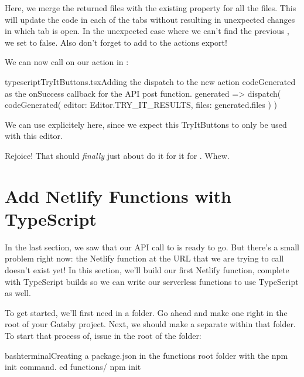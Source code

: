 \documentclass[paper=6in:9in,pagesize=pdftex,headinclude=on,footinclude=on,12pt,twoside]{scrbook}
\begin{document}
Here, we merge the returned files with the existing  property for all the files. This will update the code in each of the tabs without resulting in unexpected changes in which tab is open. In the unexpected case where we can't find the previous , we set  to false. Also don't forget to add  to the actions export!


We can now call  on our  action in :

\begin{codeInput}{typescript}{TryItButtons.tsx}{Adding the dispatch to the new action codeGenerated\, as the onSuccess callback for the API post function.}
generated => {
  dispatch(
    codeGenerated({
      editor: Editor.TRY_IT_RESULTS,
      files: generated.files
    })
  )
}
\end{codeInput}

We can use  explicitely here, since we expect this TryItButtons to only be used with this editor.

Rejoice! That should \textit{finally} just about do it for it for . Whew. 

\section{Add Netlify Functions with TypeScript}

In the last section, we saw that our API call to  is ready to go. But there's a small problem right now: the Netlify function at the URL  that we are trying to call doesn't exist yet! In this section, we'll build our first Netlify function, complete with TypeScript builds so we can write our serverless functions to use TypeScript as well.


To get started, we'll first need in a  folder. Go ahead and make one right in the root of your Gatsby project. Next, we should make a separate  within that folder. To start that process of, issue  in the root of the  folder:

\begin{codeInput}{bash}{terminal}{Creating a package.json in the functions root folder with the npm init command.}
cd functions/
npm init
\end{codeInput}
\end{document}
